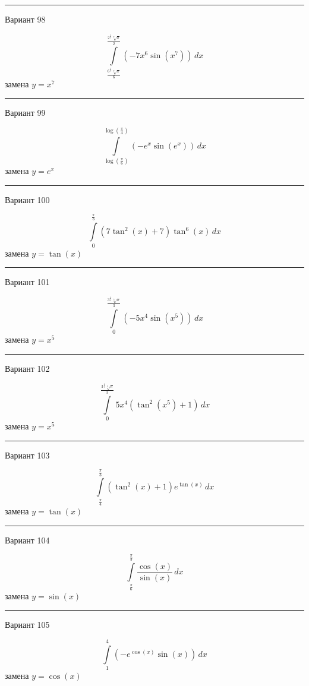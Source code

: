 \documentclass[11pt]{report}
\begin{document}
\rule{\textwidth}{.2mm}

Вариант 98

$$\int\limits_{\frac{6^{\frac{6}{7}} \sqrt[7]{\pi}}{6}}^{\frac{2^{\frac{5}{7}} \sqrt[7]{\pi}}{2}} \left(- 7 x^{6} \sin{\left(x^{7} \right)}\right)\, dx$$
замена $y = x^{7}$



\rule{\textwidth}{.2mm}

Вариант 99

$$\int\limits_{\log{\left(\frac{\pi}{6} \right)}}^{\log{\left(\frac{\pi}{4} \right)}} \left(- e^{x} \sin{\left(e^{x} \right)}\right)\, dx$$
замена $y = e^{x}$



\rule{\textwidth}{.2mm}

Вариант 100

$$\int\limits_{0}^{\frac{\pi}{3}} \left(7 \tan^{2}{\left(x \right)} + 7\right) \tan^{6}{\left(x \right)}\, dx$$
замена $y = \tan{\left(x \right)}$



\rule{\textwidth}{.2mm}

Вариант 101

$$\int\limits_{0}^{\frac{3^{\frac{4}{5}} \sqrt[5]{\pi}}{3}} \left(- 5 x^{4} \sin{\left(x^{5} \right)}\right)\, dx$$
замена $y = x^{5}$



\rule{\textwidth}{.2mm}

Вариант 102

$$\int\limits_{0}^{\frac{3^{\frac{4}{5}} \sqrt[5]{\pi}}{3}} 5 x^{4} \left(\tan^{2}{\left(x^{5} \right)} + 1\right)\, dx$$
замена $y = x^{5}$



\rule{\textwidth}{.2mm}

Вариант 103

$$\int\limits_{\frac{\pi}{4}}^{\frac{\pi}{3}} \left(\tan^{2}{\left(x \right)} + 1\right) e^{\tan{\left(x \right)}}\, dx$$
замена $y = \tan{\left(x \right)}$



\rule{\textwidth}{.2mm}

Вариант 104

$$\int\limits_{\frac{\pi}{6}}^{\frac{\pi}{3}} \frac{\cos{\left(x \right)}}{\sin{\left(x \right)}}\, dx$$
замена $y = \sin{\left(x \right)}$



\rule{\textwidth}{.2mm}

Вариант 105

$$\int\limits_{1}^{4} \left(- e^{\cos{\left(x \right)}} \sin{\left(x \right)}\right)\, dx$$
замена $y = \cos{\left(x \right)}$
\end{document}
